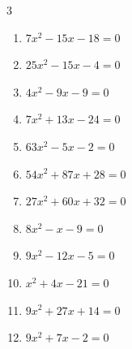 \begin{multicols}{3}
\begin{enumerate}

  \item $7x^{2}-15x-18=0$


  \item $25x^{2}-15x-4=0$


  \item $4x^{2}-9x-9=0$


  \item $7x^{2}+13x-24=0$


  \item $63x^{2}-5x-2=0$


  \item $54x^{2}+87x+28=0$


  \item $27x^{2}+60x+32=0$


  \item $8x^{2}-x-9=0$


\columnbreak %

  \item $9x^{2}-12x-5=0$


  \item $x^{2}+4x-21=0$

        \phantom{$\displaystyle x=-7,\; 3$}

  \item $9x^{2}+27x+14=0$


  \item $9x^{2}+7x-2=0$



\end{enumerate}
\end{multicols}
